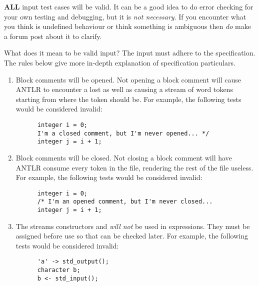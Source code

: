 \documentclass[../gazprea.tex]{subfiles}
\begin{document}
\textbf{ALL} input test cases will be valid. It can be a good idea to do error checking for your
own testing and debugging, but it is \textit{not necessary}. If you encounter what you think is
undefined behaviour or think something is ambiguous then \textit{do} make a forum post about it to
clarify.

What does it mean to be valid input? The input must adhere to the specification. The rules below
give more in-depth explanation of specification particulars.
\begin{enumerate}
  \item
    Block comments will be opened. Not opening a block comment will cause ANTLR to encounter a lost
    \code{*/} as well as causing a stream of word tokens starting from where the \code{/*} token
    should be. For example, the following tests would be considered invalid:
    \begin{lstlisting}
      integer i = 0;
      I'm a closed comment, but I'm never opened... */
      integer j = i + 1;
    \end{lstlisting}
  \item
    Block comments will be closed. Not closing a block comment will have ANTLR consume every token
    in the file, rendering the rest of the file useless. For example, the following tests would be
    considered invalid:
    \begin{lstlisting}
      integer i = 0;
      /* I'm an opened comment, but I'm never closed...
      integer j = i + 1;
    \end{lstlisting}
  \item
    The streams constructors  and  \textit{will not} be used
    in expressions. They must be assigned before use so that  can be checked
    later. For example, the following tests would be considered invalid:
    \begin{lstlisting}
      'a' -> std_output();
      character b;
      b <- std_input();
    \end{lstlisting}
\end{enumerate}
\end{document}
